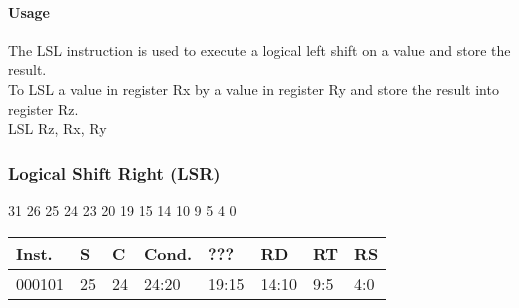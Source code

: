 \documentclass[12pt]{article}
\begin{document}
    \paragraph{Usage}
    \begin{flushleft}
    The LSL instruction is used to execute a logical left shift on a value and store the result.\\
    \vspace{1em}
    To LSL a value in register Rx by a value in register Ry and store the result into register Rz.\\
    \vspace{1em}
    LSL Rz, Rx, Ry
    \end{flushleft}
   
   




    \newpage
    \subsubsection{Logical Shift Right (LSR)}
    
    \hspace{1.6cm}31 \hspace{1.2cm}26 \hspace{.075cm}25 \hspace{.15cm}24 \hspace{.075cm}23 \hspace{.875cm}20 \hspace{.04cm}19 \hspace{.8cm}15 \hspace{.04cm}14 \hspace{.8cm}10 \hspace{.04cm}9 \hspace{1.15cm}5 \hspace{.04cm}4 \hspace{1.25cm}0
    \vspace{-.25cm}
    \begin{center}
        \begin{tabular}{ |p{1.8cm}|p{.3cm}|p{.3cm}|p{1.5cm}|p{1.5cm}|p{1.5cm}|p{1.5cm}|p{1.5cm}| }
            \hline
            \textbf{Inst.} & \textbf{S}& \textbf{C} & \textbf{Cond.} & ??? & \textbf{RD} & \textbf{RT} & \textbf{RS}\\
            \hline
            000101& 25 & 24 & 24:20 & 19:15 & 14:10 & 9:5 & 4:0\\
            \hline
        \end{tabular}
    \end{center}
    
\end{document}
